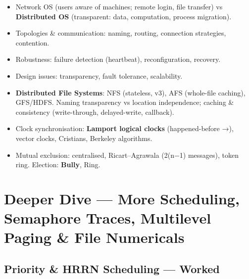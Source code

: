 \begin{itemize}
\tightlist
\item
  Network OS (users aware of machines; remote login, file transfer) vs \textbf{Distributed OS} (transparent: data, computation, process migration).
\item
  Topologies \& communication: naming, routing, connection strategies, contention.
\item
  Robustness: failure detection (heartbeat), reconfiguration, recovery.
\item
  Design issues: transparency, fault tolerance, scalability.
\item
  \textbf{Distributed File Systems}: NFS (stateless, v3), AFS (whole-file caching), GFS/HDFS. Naming transparency vs location independence; caching \& consistency (write-through, delayed-write, callback).
\item
  Clock synchronisation: \textbf{Lamport logical clocks} (happened-before →), vector clocks, Cristian\textquotesingle s, Berkeley algorithms.
\item
  Mutual exclusion: centralised, Ricart--Agrawala (2(n−1) messages), token ring. Election: \textbf{Bully}, Ring.
\end{itemize}

\needspace{166pt}

\hypertarget{p2-05--14-deeper-dive--more-scheduling-semaphore-traces-multilevel-paging--file-numericals}{%
\section{Deeper Dive --- More Scheduling, Semaphore Traces, Multilevel Paging \& File Numericals}\label{p2-05--14-deeper-dive--more-scheduling-semaphore-traces-multilevel-paging--file-numericals}}

\needspace{130pt}

\hypertarget{p2-05--141-priority--hrrn-scheduling--worked}{%
\subsection{Priority \& HRRN Scheduling --- Worked}\label{p2-05--141-priority--hrrn-scheduling--worked}}

\begingroup\small

